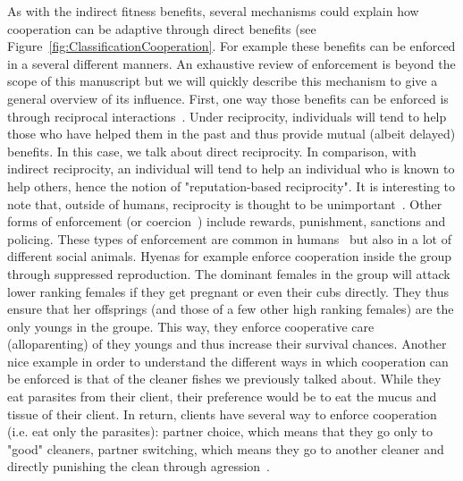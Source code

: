     As with the indirect fitness benefits, several mechanisms could explain how cooperation can be adaptive through direct benefits (see Figure~\ref{fig:ClassificationCooperation}. For example these benefits can be enforced in a several different manners. An exhaustive review of enforcement is beyond the scope of this manuscript but we will quickly describe this mechanism to give a general overview of its influence. First, one way those benefits can be enforced is through reciprocal interactions~\parencite{Trivers1971}. Under reciprocity, individuals will tend to help those who have helped them in the past and thus provide mutual (albeit delayed) benefits. In this case, we talk about direct reciprocity. In comparison, with indirect reciprocity, an individual will tend to help an individual who is known to help others, hence the notion of "reputation-based reciprocity". It is interesting to note that, outside of humans, reciprocity is thought to be unimportant~\parencite{Dugatkin1997}. Other forms of enforcement (or coercion~\parencite{Clutton-Brock2002}) include rewards, punishment, sanctions and policing. These types of enforcement are common in humans~\parencite{Fehr2002} but also in a lot of different social animals. Hyenas for example enforce cooperation inside the group through suppressed reproduction. The dominant females in the group will attack lower ranking females if they get pregnant or even their cubs directly. They thus ensure that her offsprings (and those of a few other high ranking females) are the only youngs in the groupe. This way, they enforce cooperative care (alloparenting) of they youngs and thus increase their survival chances. Another nice example in order to understand the different ways in which cooperation can be enforced is that of the cleaner fishes we previously talked about. While they eat parasites from their client, their preference would be to eat the mucus and tissue of their client. In return, clients have several way to enforce cooperation (i.e. eat only the parasites): partner choice, which means that they go only to "good" cleaners, partner switching, which means they go to another cleaner and directly punishing the clean through agression~\parencite{Bshary2005}.


